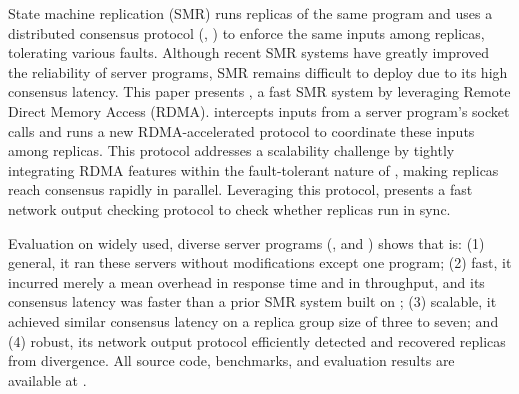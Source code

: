 

State machine replication (SMR) runs replicas of the same program and 
uses a distributed consensus protocol (\eg, \paxos) to enforce the same inputs 
among replicas, tolerating various faults. Although recent SMR systems have 
greatly improved the reliability of server programs, SMR remains difficult to 
deploy due to its high consensus latency. This paper presents \xxx, 
a fast SMR system by leveraging Remote Direct Memory Access (RDMA). \xxx 
intercepts inputs from a server program's socket calls and runs a new 
RDMA-accelerated \paxos protocol to coordinate these inputs among replicas. This 
protocol addresses a \paxos scalability challenge by tightly integrating RDMA 
features within the fault-tolerant nature of \paxos, making replicas reach 
consensus rapidly in parallel. Leveraging this protocol, \xxx presents a fast 
network output checking protocol to check whether replicas run in sync.


Evaluation on \nprog widely used, diverse server programs (\eg, \memcached and 
\mysql) shows that \xxx is: (1) general, it ran these servers 
without modifications except one program; (2) fast, it incurred merely a 
\latencyoverhead mean overhead in response time and \tputoverhead in 
throughput, and its consensus latency was \fasterthanzookeeper faster than 
a prior SMR system built on \zookeeper; (3) scalable, it achieved similar 
consensus latency on a replica group size of three to seven; and (4) 
robust, its network output protocol efficiently detected and recovered replicas 
from divergence. All \xxx source code, benchmarks, and evaluation results are 
available at \github.

